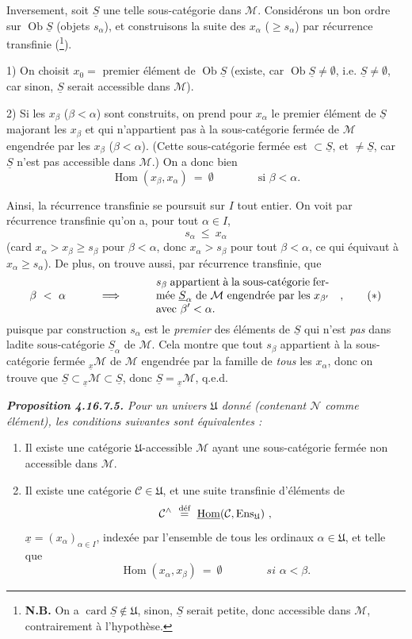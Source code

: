 \documentclass[11pt]{article}
\newcommand{\printedpage}[1]{\marginpar{\footnotesize p.~#1}}
\newcommand{\msp}[1]{\marginpar{\footnotesize [#1]}}
\newcommand{\cC}{\mathcal{C}}
\newcommand{\cM}{\mathcal{M}}
\newcommand{\Ob}{\operatorname{Ob}}
\newcommand{\Hom}{\operatorname{Hom}}
\newcommand{\card}{\operatorname{card}}
\newcommand{\uS}{\underline{S}}
\newcommand{\U}{\mathfrak{U}}
\begin{document}
Inversement, soit $\uS$ une telle sous-catégorie dans $\cM$. Considérons un bon ordre sur $\Ob \uS$ (objets $s_\alpha$), et construisons la suite des $x_\alpha$ ($\geqslant s_\alpha$) par récurrence transfinie (\footnote{\textbf{N.B.} On a $\card \uS \notin \U$, sinon, $\uS$ serait petite, donc accessible dans $\cM$, contrairement à l'hypothèse.}).

1) On choisit $x_0 =$ premier élément de $\Ob \uS$ (existe, car $\Ob \uS \neq \emptyset$, i.e. $\uS \neq \emptyset$, car sinon, $\uS$ serait accessible dans $\cM$).

2) Si les $x_\beta$ ($\beta < \alpha$) sont construits, on prend pour $x_\alpha$ le premier élément de $\uS$ majorant les $x_\beta$ et qui n'appartient pas à la sous-catégorie fermée de $\cM$ engendrée par les $x_\beta$ ($\beta < \alpha$). (Cette sous-catégorie fermée est $\subset \uS$, et $\neq \uS$, car $\uS$ n'est pas accessible dans $\cM$.) On a donc bien
\[
\Hom(x_\beta, x_\alpha) \ =\ \emptyset \qquad\qquad \text{si } \beta < \alpha.
\]

\printedpage{187}

\msp{page 483}
Ainsi, la récurrence transfinie se poursuit sur $I$ tout entier. On voit par récurrence transfinie qu'on a, pour tout $\alpha \in I$,
\[
s_\alpha \ \leqslant\ x_\alpha
\]
(card $x_\alpha > x_\beta \geqslant s_\beta$ pour $\beta < \alpha$, donc $x_\alpha > s_\beta$ pour tout $\beta < \alpha$, ce qui équivaut à $x_\alpha \geqslant s_\alpha$). De plus, on trouve aussi, par récurrence transfinie, que
\[
\beta \ <\ \alpha \qquad\quad \Longrightarrow \qquad\quad
\text{\parbox[c]{5.5cm}{$s_\beta$ appartient à la sous-catégorie fermée $\uS_\alpha$ de $\cM$ engendrée par les $x_{\beta'}$ avec $\beta' < \alpha$.}}
\quad ,
\tag*{$(*)$}
\]
puisque par construction $s_\alpha$ est le \textit{premier} des éléments de $\uS$ qui n'est \textit{pas} dans ladite sous-catégorie $\uS_\alpha$ de $\cM$. Cela montre que tout $s_\beta$ appartient à la sous-catégorie fermée ${}_{\underline{x}}\cM$ de $\cM$ engendrée par la famille de \textit{tous} les $x_\alpha$, donc on trouve que $\uS \subset {}_{\underline{x}}\cM \subset \uS$, donc $\uS = {}_{\underline{x}}\cM$, q.e.d.

\begingroup\itshape
\noindent\textbf{\upshape Proposition 4.16.7.5.} Pour un univers $\U$ donné (contenant $\mathcal{N}$ comme élément), les conditions suivantes sont équivalentes :
\begin{enumerate}[label={}]
\item[1)] Il existe une catégorie $\U$-accessible $\cM$ ayant une sous-catégorie fermée non accessible %
\msp{page 484}
dans $\cM$.
\item[b)] Il existe une catégorie $\cC \in \U$, et une suite transfinie d'éléments de
\[
\cC^\wedge \ \overset{\text{\upshape déf}}{=}\ \underline{\mathrm{Hom}}(\cC, \mathrm{Ens}_{\U}) \ ,
\]
$\underline{x} = (x_\alpha)_{\alpha\in I}$, indexée par l'ensemble de tous les ordinaux $\alpha \in \U$, et telle que
\[
\Hom(x_\alpha, x_\beta) \ =\ \emptyset \qquad\qquad \textit{si } \alpha < \beta.
\]
\end{enumerate}
\endgroup
\end{document}
